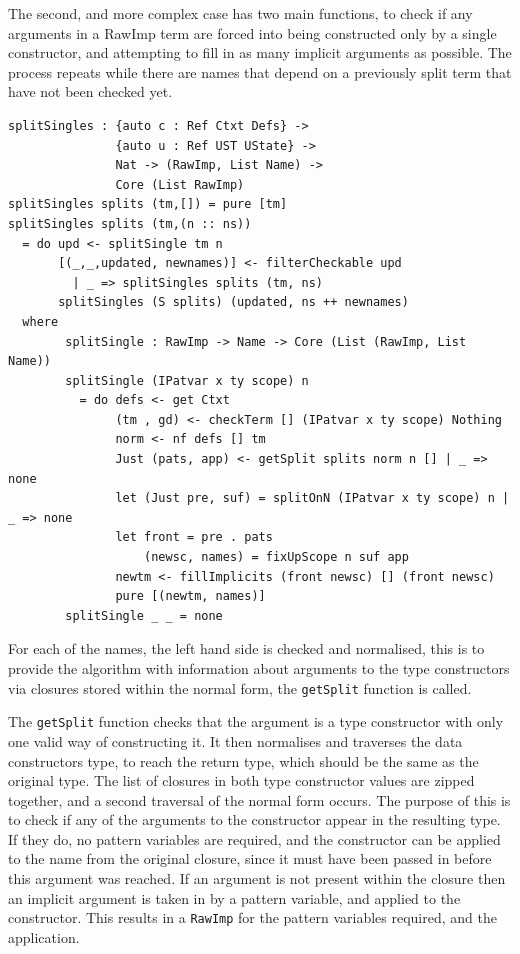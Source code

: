\documentclass[a4paper]{article}
\begin{document}
The second, and more complex case has two main functions, 
to check if any arguments in a RawImp term are forced into being
constructed only by a single constructor, and attempting to fill
in as many implicit arguments as possible. The process repeats
while there are names that depend on a previously split term that
have not been checked yet.

\begin{center}
  \begin{verbatim}
splitSingles : {auto c : Ref Ctxt Defs} -> 
               {auto u : Ref UST UState} ->
               Nat -> (RawImp, List Name) -> 
               Core (List RawImp)
splitSingles splits (tm,[]) = pure [tm]
splitSingles splits (tm,(n :: ns)) 
  = do upd <- splitSingle tm n 
       [(_,_,updated, newnames)] <- filterCheckable upd
         | _ => splitSingles splits (tm, ns)
       splitSingles (S splits) (updated, ns ++ newnames)
  where  
        splitSingle : RawImp -> Name -> Core (List (RawImp, List Name))
        splitSingle (IPatvar x ty scope) n
          = do defs <- get Ctxt
               (tm , gd) <- checkTerm [] (IPatvar x ty scope) Nothing
               norm <- nf defs [] tm
               Just (pats, app) <- getSplit splits norm n [] | _ => none
               let (Just pre, suf) = splitOnN (IPatvar x ty scope) n | _ => none
               let front = pre . pats 
                   (newsc, names) = fixUpScope n suf app
               newtm <- fillImplicits (front newsc) [] (front newsc) 
               pure [(newtm, names)] 
        splitSingle _ _ = none
  \end{verbatim}
\end{center}

For each of the names, the left hand side is checked and normalised,
this is to provide the algorithm with information about arguments to
the type constructors via closures stored within the normal form,
the \texttt{getSplit} function is called.

The \texttt{getSplit} function checks that the argument is a type
constructor with only one valid way of constructing it. It then
normalises and traverses the data constructors type, to reach
the return type, which should be the same as the original type.
The list of closures in both type constructor values are zipped
together, and a second traversal of the normal form occurs. The
purpose of this is to check if any of the arguments to the constructor
appear in the resulting type. If they do, no pattern variables
are required, and the constructor can be applied to the name from the
original closure, since it must have been passed in before this argument
was reached. If an argument is not present within the closure then
an implicit argument is taken in by a pattern variable, and applied to
the constructor. This results in a \texttt{RawImp} for the pattern variables
required, and the application. 
\end{document}
